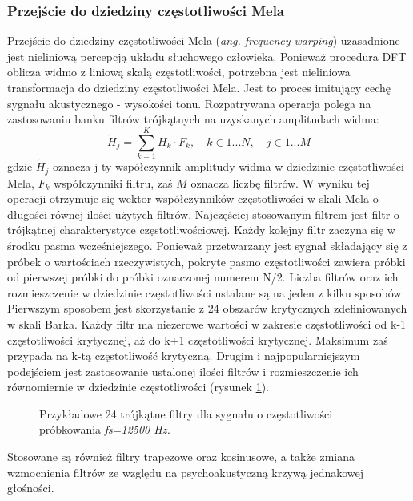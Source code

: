 \subsubsection{Przejście do dziedziny częstotliwości Mela}
Przejście do dziedziny częstotliwości Mela (\textit{ang. frequency warping}) uzasadnione jest nieliniową percepcją układu słuchowego człowieka. Ponieważ procedura DFT oblicza widmo z liniową skalą częstotliwości, potrzebna jest nieliniowa transformacja do dziedziny częstotliwości Mela. Jest to proces imitujący cechę sygnału akustycznego - wysokości tonu.
Rozpatrywana operacja polega na zastosowaniu banku filtrów trójkątnych na uzyskanych amplitudach widma:
\begin{equation}
  \tilde{H}_j = \sum_{k=1}^{K} H_k \cdot F_k, \quad k \in {1...N}, \quad  j \in {1...M}
\end{equation}
gdzie $\tilde{H}_j$ oznacza j-ty współczynnik amplitudy widma w dziedzinie częstotliwości Mela, $F_k$ współczynniki filtru, zaś $M$ oznacza liczbę filtrów.
W wyniku tej operacji otrzymuje się wektor współczynników częstotliwości w skali Mela o długości równej ilości użytych filtrów. Najczęściej stosowanym filtrem jest filtr o trójkątnej charakterystyce częstotliwościowej. Każdy kolejny filtr zaczyna się w środku pasma wcześniejszego. Ponieważ przetwarzany jest sygnał składający się z próbek o wartościach rzeczywistych, pokryte pasmo częstotliwości zawiera próbki od pierwszej próbki do próbki oznaczonej numerem N/2. Liczba filtrów oraz ich rozmieszczenie w dziedzinie częstotliwości ustalane są na jeden z kilku sposobów.
Pierwszym sposobem jest skorzystanie z 24 obszarów krytycznych zdefiniowanych w skali Barka. Każdy filtr ma niezerowe wartości w zakresie częstotliwości od k-1 częstotliwości krytycznej, aż do k+1 częstotliwości krytycznej. Maksimum zaś przypada na k-tą częstotliwość krytyczną.
Drugim i najpopularniejszym podejściem jest zastosowanie ustalonej ilości filtrów i rozmieszczenie ich równomiernie w dziedzinie częstotliwości (rysunek \ref{melfb}).

\begin{figure}
  \centering
    
    \label{melfb}
    \caption{Przykładowe 24 trójkątne filtry dla sygnału o częstotliwości próbkowania \textit{fs=12500 Hz.}}
\end{figure}

Stosowane są również filtry trapezowe oraz kosinusowe, a także zmiana wzmocnienia filtrów ze względu na psychoakustyczną krzywą jednakowej głośności. 

